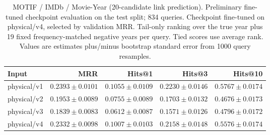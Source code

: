 \begin{table}[t]
\centering
\small
\begin{tabular}{lrrrr}
\toprule
Input & MRR & Hits@1 & Hits@3 & Hits@10 \\
\midrule
physical/v1 & $0.2393 \pm 0.0101$ & $0.1055 \pm 0.0109$ & $0.2230 \pm 0.0146$ & $0.5767 \pm 0.0174$ \\
physical/v2 & $0.1953 \pm 0.0089$ & $0.0755 \pm 0.0089$ & $0.1703 \pm 0.0132$ & $0.4676 \pm 0.0173$ \\
physical/v3 & $0.1839 \pm 0.0083$ & $0.0612 \pm 0.0087$ & $0.1571 \pm 0.0126$ & $0.4796 \pm 0.0172$ \\
physical/v4 & $0.2332 \pm 0.0098$ & $0.1007 \pm 0.0103$ & $0.2158 \pm 0.0148$ & $0.5576 \pm 0.0174$ \\
\bottomrule
\end{tabular}
\caption{MOTIF / IMDb / Movie-Year (20-candidate link prediction). Preliminary fine-tuned checkpoint evaluation on the test split; 834 queries. Checkpoint fine-tuned on physical/v4, selected by validation MRR. Tail-only ranking over the true year plus 19 fixed frequency-matched negative years per query. Tied scores use average rank. Values are estimates plus/minus bootstrap standard error from 1000 query resamples.}
\label{tab:motif-movie_year-link_prediction}
\end{table}
